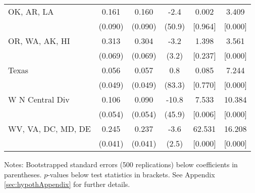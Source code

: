 \begin{landscape}
\begin{table}[ht]
{\begin{threeparttable}
\begin{tabular}{lccccc}
OK, AR, LA & 0.161 & 0.160 & -2.4 & 0.002 & 3.409 \\ 
 & (0.090) & (0.090) & (50.9) & [0.964] & [0.000] \\ 
OR, WA, AK, HI & 0.313 & 0.304 & -3.2 & 1.398 & 3.561 \\ 
 & (0.069) & (0.069) & (3.2) & [0.237] & [0.000] \\ 
Texas & 0.056 & 0.057 & 0.8 & 0.085 & 7.244 \\ 
 & (0.049) & (0.049) & (83.3) & [0.770] & [0.000] \\ 
W N Central Div & 0.106 & 0.090 & -10.8 & 7.533 & 10.384 \\ 
 & (0.054) & (0.054) & (45.9) & [0.006] & [0.000] \\ 
WV, VA, DC, MD, DE & 0.245 & 0.237 & -3.6 & 62.531 & 16.208 \\ 
 & (0.041) & (0.041) & (2.5) & [0.000] & [0.000] \\ 
\bottomrule
\end{tabular}
{\footnotesize {\raggedright Notes: Bootstrapped standard errors (500 replications) below coefficients in parentheses. $p$-values below test statistics in brackets. See Appendix \ref{sec:hypothAppendix} for further details.}}
\end{threeparttable}
}
\end{table}
\end{landscape}
